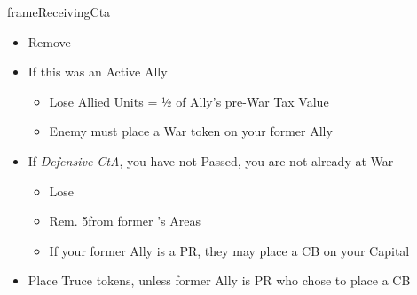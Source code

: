 \documentclass[10pt]{article}
\newlength{\fhReceivingCta} \setlength\fhReceivingCta{\calc{17\baselineskip}}
\begin{document}
\begin{dynamiccontents*}{frameReceivingCta}
\begin{eubox}{\fhReceivingCta}
\begin{multicols}{2}
\begin{itemize}
			\item Remove \alliance
			\item If this was an Active Ally
			\begin{itemize}
				\item Lose Allied Units = ½ of Ally's pre-War Tax Value
				\item Enemy must place a War token on your former Ally
			\end{itemize}
			\item If \emph{Defensive CtA},  you have not Passed,  you are not already at War
			\begin{itemize}
				\item Lose 
				\item Rem. 5\influence from former \ally's Areas
				\item If your former Ally is a PR, they may place a CB on your Capital
			\end{itemize}
			\item Place Truce tokens, unless former Ally is PR who chose to place a CB
		\end{itemize}
	\end{multicols}
\end{eubox}\end{dynamiccontents*}
\end{document}
